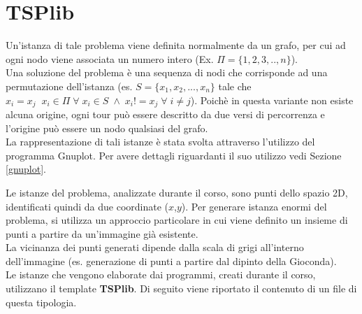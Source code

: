 \chapter{TSPlib}
Un'istanza di tale problema viene definita normalmente da un grafo, per cui ad ogni nodo viene associata un numero intero (Ex. $\Pi = \{1,2,3,..,n\}$). \\
Una soluzione del problema è una sequenza di nodi che corrisponde ad una permutazione dell'istanza (es. $S = \{x_1,x_2,...,x_n\}$ tale che $x_i=x_j\;\;x_i \in \Pi\;\forall\;x_i\in S\;\wedge\; x_i!=x_j\;\forall\;i\neq j$). Poichè in questa variante non esiste alcuna origine, ogni tour può essere descritto da due versi di percorrenza e l'origine può essere un nodo qualsiasi del grafo.\\
La rappresentazione di tali istanze è stata svolta attraverso l'utilizzo del programma Gnuplot. Per avere dettagli riguardanti il suo utilizzo vedi Sezione \ref{gnuplot}.

Le istanze del problema, analizzate durante il corso, sono punti dello spazio 2D, identificati quindi da due coordinate ($x$,$y$).
Per generare istanza enormi del problema, si utilizza un approccio particolare in cui viene definito un insieme di punti a partire da un'immagine già esistente.\\
La vicinanza dei punti generati dipende dalla scala di grigi all'interno dell'immagine (es. generazione di punti a partire dal dipinto della Gioconda\cite{monnalisa}).\\
Le istanze che vengono elaborate dai programmi, creati durante il corso, utilizzano il template \textbf{TSPlib}. Di seguito viene riportato il contenuto di un file di questa tipologia.
 


